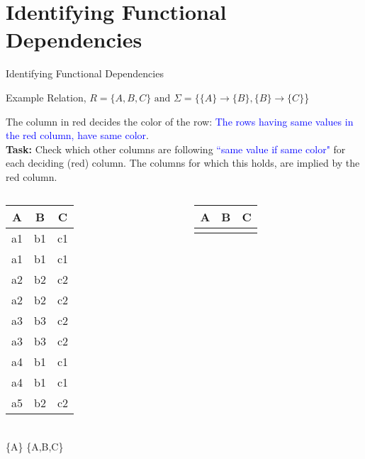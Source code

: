 \section{Identifying Functional Dependencies}
\begin{frame}{Identifying Functional Dependencies}
\small
\begin{center}
    Example Relation,  $R = \{A,B,C\} \text{ and } \Sigma =\{\{A\} \rightarrow \{B\}, \{B\} \rightarrow \{C\}$\}
\end{center}
\tiny
The column in \alert{red} decides the color of the row: \textcolor{blue}{The rows having same values in the \alert{red} column, have same color}.\\
\textbf{Task:} Check which other columns are following \textcolor{blue}{``same value if same color"} for each deciding (\alert{red}) column. The columns for which this holds, are implied by the \alert{red} column.
\footnotesize
\begin{columns}
    \begin{column}{0.32\textwidth}
        \begin{table}[t]
\centering
\begin{tabular}{ccc}
\toprule
\textbf{\alert{A}} & \textbf{B} & \textbf{C} \\
\toprule
\rowcolor{Dandelion}
a1 & b1 & c1 \\
\rowcolor{Dandelion}
a1 & b1 & c1 \\
\rowcolor{lightgray}
a2 & b2 & c2 \\
\rowcolor{lightgray}
a2 & b2 & c2 \\
\rowcolor{Thistle}
a3 & b3 & c2 \\
\rowcolor{Thistle}
a3 & b3 & c2 \\
\rowcolor{YellowGreen}
a4 & b1 & c1 \\
\rowcolor{YellowGreen}
a4 & b1 & c1 \\
a5 & b2 & c2 \\
\bottomrule
\end{tabular}\\
\pause
\{\alert{A}\} \rightarrow \{A,B,C\}
\end{table}
    \end{column}
    \pause
    \begin{column}{0.32\textwidth}
        \begin{table}[t]
\centering
\begin{tabular}{ccc}
\toprule
\textbf{A} & \textbf{\alert{B}} & \textbf{C} \\
\toprule
\rowcolor{Dandelion}

\end{tabular}
\end{table}
\end{column}
\end{columns}
\end{frame}
